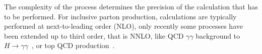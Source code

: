 %
The complexity of the process determines the precision of the calculation that has to be performed.  %
For inclusive parton production, calculations are typically performed at next-to-leading order (NLO),  only recently some processes have been extended up to third order, that is NNLO, like QCD $\gamma\gamma$ background to $H\rightarrow\gamma\gamma$~\cite{Catani2011qz}, or top QCD production~\cite{Baernreuther2012ws}.  %

